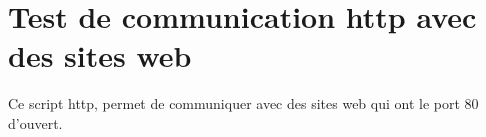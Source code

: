 \documentclass[../file_doc_script.tex]{subfiles}
\begin{document}
\section{Test de communication http avec des sites web}
Ce script http, permet de communiquer avec des sites web qui ont le port 80 d'ouvert.

\UseRawInputEncoding

\end{document}
